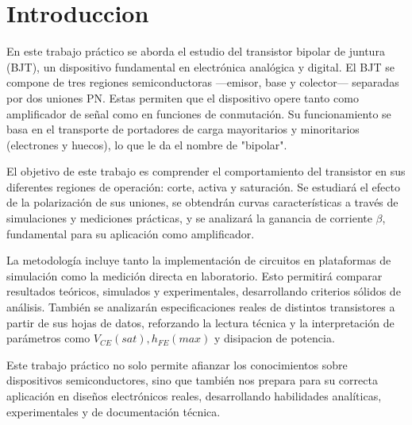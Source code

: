 \chapter{Introduccion}
  En este trabajo práctico se aborda el estudio del transistor bipolar de juntura (BJT), un dispositivo fundamental en
  electrónica analógica y digital. El BJT se compone de tres regiones semiconductoras —emisor, base y colector—
  separadas por dos uniones PN. Estas permiten que el dispositivo opere tanto como amplificador de señal como en
  funciones de conmutación. Su funcionamiento se basa en el transporte de portadores de carga mayoritarios y
  minoritarios (electrones y huecos), lo que le da el nombre de "bipolar".

  El objetivo de este trabajo es comprender el comportamiento del transistor en sus diferentes regiones de operación:
  corte, activa y saturación. Se estudiará el efecto de la polarización de sus uniones, se obtendrán curvas
  características a través de simulaciones y mediciones prácticas, y se analizará la ganancia de corriente $\beta$,
  fundamental para su aplicación como amplificador.

  La metodología incluye tanto la implementación de circuitos en plataformas de simulación como la medición directa en
  laboratorio. Esto permitirá comparar resultados teóricos, simulados y experimentales, desarrollando criterios sólidos
  de análisis. También se analizarán especificaciones reales de distintos transistores a partir de sus hojas de datos,
  reforzando la lectura técnica y la interpretación de parámetros como $V_{CE}(sat), h_{FE}(max)$ y disipacion de
  potencia.

  Este trabajo práctico no solo permite afianzar los conocimientos sobre dispositivos semiconductores, sino que también
  nos prepara para su correcta aplicación en diseños electrónicos reales, desarrollando habilidades analíticas,
  experimentales y de documentación técnica.
